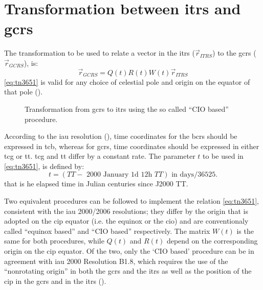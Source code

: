 \section{Transformation between \gls{itrs} and \gls{gcrs}}
\label{transformation-itrs-gcrs}
The transformation to be used to relate a vector in the \gls{itrs} (\(\vec{r}_{ITRS}\)) 
to the \gls{gcrs} (\(\vec{r}_{GCRS}\)), is:
\begin{equation}
  \label{eq:tn3651}
  \vec{r}_{GCRS} = Q(t) R(t) W(t) \vec{r}_{ITRS}
\end{equation}
\ref{eq:tn3651} is valid for any choice of celestial pole and origin on the equator 
of that pole (\cite{iers2010}).

\begin{figure}
\centering

\caption{Transformation from \gls{gcrs} to \gls{itrs} using the so called ``CIO based'' procedure.}
\label{fig:bcrs-to-itrs}
\end{figure}

According to the \gls{iau} resolution (\cite{iers2010}), time coordinates for the 
\gls{bcrs} should be expressed in \gls{tcb}, whereas for \gls{gcrs}, time coordinates 
should be expressed in either \gls{tcg} or \gls{tt}. \gls{tcg} and \gls{tt} differ 
by a constant rate. The parameter \(t\) to be used in \ref{eq:tn3651}, is defined by:
\begin{equation}
  \label{eq:tn3652}
  t = (TT - \text{ 2000 January 1d 12h } TT) \text{ in days} / 36525.
\end{equation}
that is he elapsed time in Julian centuries since J2000 TT.

Two equivalent procedures can be followed to implement the relation \ref{eq:tn3651}, 
consistent with the \gls{iau} 2000/2006 resolutions; they differ by the origin 
that is adopted on the \gls{cip} equator (i.e. the equinox or the \gls{cio}) and 
are conventionaly called ``equinox based'' and ``CIO based'' respectively. The matrix 
\(W(t)\) is the same for both procedures, while \(Q(t)\) and \(R(t)\) depend on the 
corresponding origin on the \gls{cip} equator. Of the two, only the `CIO based'
procedure can be in agreement with \gls{iau} 2000 Resolution B1.8, which requires 
the use of the ``nonrotating origin'' in both the \gls{gcrs} and the \gls{itrs} as 
well as the position of the \gls{cip} in the \gls{gcrs} and in the \gls{itrs} 
(\cite{iers2010}).

